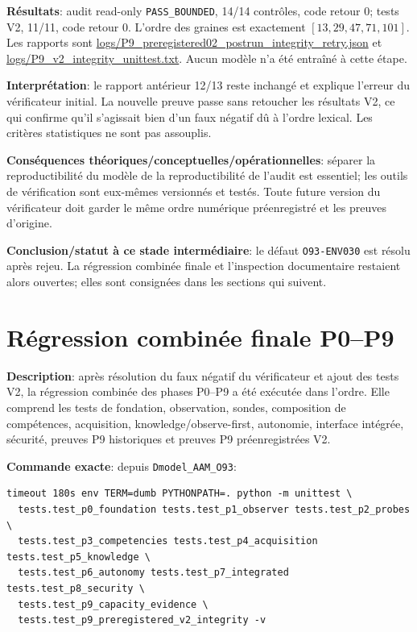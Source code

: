 \documentclass[11pt,a4paper,oneside]{report}
\begin{document}
\textbf{Résultats}: audit read-only \texttt{PASS\_BOUNDED}, 14/14 contrôles, code retour 0; tests V2, 11/11, code retour 0. L'ordre des graines est exactement \([13,29,47,71,101]\). Les rapports sont \url{logs/P9_preregistered02_postrun_integrity_retry.json} et \url{logs/P9_v2_integrity_unittest.txt}. Aucun modèle n'a été entraîné à cette étape.

\textbf{Interprétation}: le rapport antérieur 12/13 reste inchangé et explique l'erreur du vérificateur initial. La nouvelle preuve passe sans retoucher les résultats V2, ce qui confirme qu'il s'agissait bien d'un faux négatif dû à l'ordre lexical. Les critères statistiques ne sont pas assouplis.

\textbf{Conséquences théoriques/conceptuelles/opérationnelles}: séparer la reproductibilité du modèle de la reproductibilité de l'audit est essentiel; les outils de vérification sont eux-mêmes versionnés et testés. Toute future version du vérificateur doit garder le même ordre numérique préenregistré et les preuves d'origine.

\textbf{Conclusion/statut à ce stade intermédiaire}: le défaut \texttt{O93-ENV030} est résolu après rejeu. La régression combinée finale et l’inspection documentaire restaient alors ouvertes; elles sont consignées dans les sections qui suivent.


\section{Régression combinée finale P0--P9}
\textbf{Description}: après résolution du faux négatif du vérificateur et ajout des tests V2, la régression combinée des phases P0--P9 a été exécutée dans l'ordre. Elle comprend les tests de fondation, observation, sondes, composition de compétences, acquisition, knowledge/observe-first, autonomie, interface intégrée, sécurité, preuves P9 historiques et preuves P9 préenregistrées V2.

\textbf{Commande exacte}: depuis \texttt{Dmodel\_AAM\_O93}:
\begin{lstlisting}[basicstyle=\ttfamily\small,breaklines=true]
timeout 180s env TERM=dumb PYTHONPATH=. python -m unittest \
  tests.test_p0_foundation tests.test_p1_observer tests.test_p2_probes \
  tests.test_p3_competencies tests.test_p4_acquisition tests.test_p5_knowledge \
  tests.test_p6_autonomy tests.test_p7_integrated tests.test_p8_security \
  tests.test_p9_capacity_evidence \
  tests.test_p9_preregistered_v2_integrity -v
\end{lstlisting}
\end{document}
